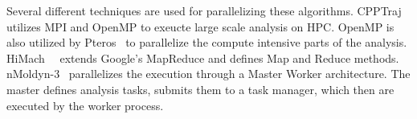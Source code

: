 Several different techniques are used for parallelizing these algorithms.
CPPTraj~\cite{roe2018parallelization} utilizes MPI and OpenMP to exeucte large scale analysis on HPC.
OpenMP is also utilized by Pteros~\cite{yesylevskyy2015pteros} to parallelize the compute intensive parts of the analysis.
HiMach~~\cite{tiankai2008scalable} extends Google's MapReduce and defines Map and Reduce methods.
nMoldyn-3~\cite{hinsen2012nmoldyn} parallelizes the execution through a Master Worker architecture.
The master defines analysis tasks, submits them to a task manager, which then are executed by the worker process.





